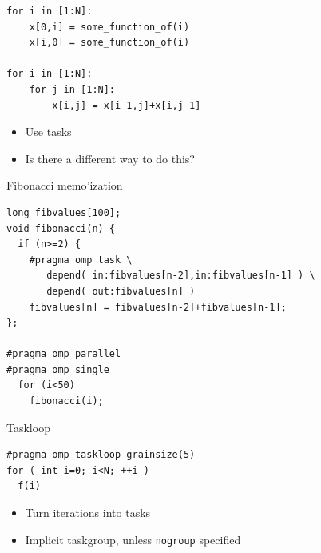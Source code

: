 \begin{exerciseframe}
  
\end{exerciseframe}

\begin{exerciseframe}
\begin{lstlisting}
for i in [1:N]:
    x[0,i] = some_function_of(i)
    x[i,0] = some_function_of(i)

for i in [1:N]:
    for j in [1:N]:
        x[i,j] = x[i-1,j]+x[i,j-1]
\end{lstlisting}
  \begin{itemize}
  \item Use tasks
  \item Is there a different way to do this?
  \end{itemize}
\end{exerciseframe}

\begin{numberedframe}{Fibonacci memo'ization}
\begin{lstlisting}
long fibvalues[100];
void fibonacci(n) {
  if (n>=2) {
    #pragma omp task \
       depend( in:fibvalues[n-2],in:fibvalues[n-1] ) \
       depend( out:fibvalues[n] )
    fibvalues[n] = fibvalues[n-2]+fibvalues[n-1];
};

#pragma omp parallel
#pragma omp single
  for (i<50)
    fibonacci(i);
\end{lstlisting}
\end{numberedframe}


\begin{numberedframe}{Taskloop}
\begin{lstlisting}
#pragma omp taskloop grainsize(5)
for ( int i=0; i<N; ++i )
  f(i)
\end{lstlisting}
  \begin{itemize}
  \item Turn iterations into tasks
  \item Implicit taskgroup, unless \lstinline{nogroup} specified
  \end{itemize}
\end{numberedframe}

\endinput

\begin{numberedframe}{}
\begin{lstlisting}
\end{lstlisting}
  \begin{itemize}
  \item 
  \end{itemize}
\end{numberedframe}

